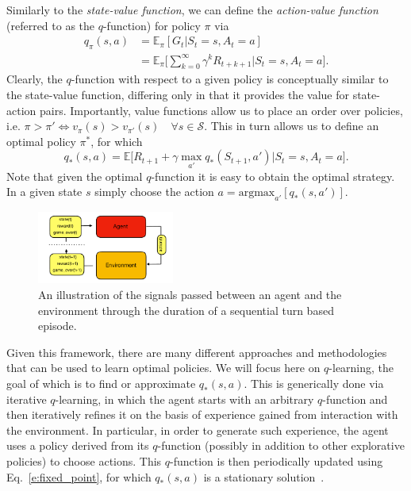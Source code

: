 \documentclass[twocolumn,preprintnumbers,amsmath,amssymb,notitlepage,nofootinbib,longbibliography,superscriptaddress,aps,pra,10pt]{revtex4-1}
\begin{document}
	Similarly to the \textit{state-value function}, we can define the \textit{action-value function}  (referred to as the $q$-function) for policy $\pi$ via
	\begin{align}
		q_{\pi}(s,a) &= \mathbb{E}_{\pi}[G_t|S_t = s, A_t = a]  \nonumber\\
		& = \mathbb{E}_{\pi} \Big[\sum_{k = 0}^{\infty}\gamma^k R_{t+k+1}\Big| S_t = s, A_t = a \Big] .
	\end{align}
	Clearly, the $q$-function with respect to a given policy is conceptually similar to the state-value function, differing only in that it provides the value for state-action pairs.
	Importantly, value functions allow us to place an order over policies, i.e. $\pi > \pi' \iff v_{\pi}(s) > v_{\pi'}(s)\quad \forall s \in \mathcal{S} $.
	This in turn allows us to define an optimal policy $\pi^*$, for which
	\begin{equation}\label{e:fixed_point}
		q_*(s,a) = \mathbb{E}\big[R_{t+1} + \gamma\max_{a'}q_{*}(S_{t+1},a')\big|S_t = s, A_t = a \big].
	\end{equation}
	Note that given the optimal $q$-function it is easy to obtain the optimal strategy. In a given state $s$ simply choose the action $a = \mathrm{argmax}_{a'}[q_*(s,a')]$.



	\begin{figure}
		\centering
		\includegraphics[width=0.4\textwidth]{figures/agent_environment.pdf}
		\caption{
			An illustration of the signals passed between an agent and the environment through the duration of a sequential turn based episode.
		}
		\label{f:agent_environment}
	\end{figure}
	Given this framework, there are many different approaches and methodologies that can be used to learn optimal policies.
	We will focus here on $q$-learning, the goal of which is to find or approximate $q_*(s,a)$.
	This is generically done via iterative $q$-learning, in which the agent starts with an arbitrary $q$-function and then iteratively refines it on the basis of experience gained from interaction with the environment.
	In particular, in order to generate such experience, the agent uses a policy derived from its $q$-function (possibly in addition to other explorative policies) to choose actions.
	This $q$-function is then periodically updated using Eq.~\eqref{e:fixed_point}, for which $q_*(s,a)$ is a stationary solution~\cite{RLSutton18}.
\end{document}
